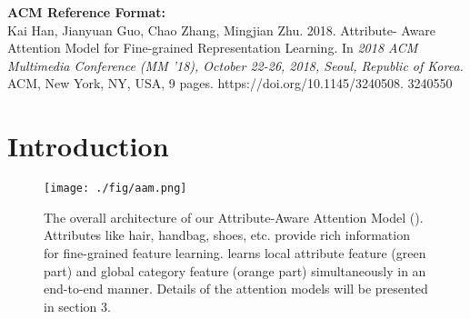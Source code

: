 \documentclass[sigconf]{acmart}
\begin{document}


\maketitle

\begin{spacing}{0.85 }
{\small
\textbf{ACM Reference Format:}\\
Kai Han, Jianyuan Guo, Chao Zhang, Mingjian Zhu. 2018. Attribute-
Aware Attention Model for Fine-grained Representation Learning. In \emph{2018
ACM Multimedia Conference (MM '18), October 22-26, 2018, Seoul, Republic of
Korea.} ACM, New York, NY, USA, 9 pages. https://doi.org/10.1145/3240508.
3240550
}
\end{spacing}
\vspace{0cm}

\section{Introduction}

\begin{figure}[!htp]
\begin{center}
   \texttt{[image: ./fig/aam.png]}
\end{center}
   \caption{The overall architecture of our Attribute-Aware Attention Model (). Attributes like hair, handbag, shoes, etc. provide rich information for fine-grained feature learning.  learns local attribute feature (green part) and global category feature (orange part) simultaneously in an end-to-end manner. Details of the attention models will be presented in section 3.}
\label{fig:fig1}
\end{figure}
\end{document}
